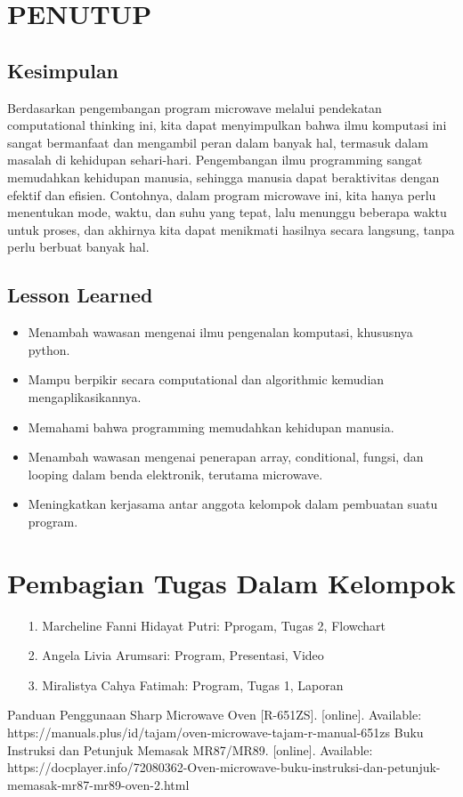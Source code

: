 \documentclass[conference]{IEEEtran}
\begin{document}
\clearpage
\section{PENUTUP}

\subsection{Kesimpulan}
Berdasarkan pengembangan program microwave melalui pendekatan computational thinking ini, kita dapat menyimpulkan bahwa ilmu komputasi ini sangat bermanfaat dan mengambil peran dalam banyak hal,
termasuk dalam masalah di kehidupan sehari-hari. Pengembangan ilmu programming sangat memudahkan kehidupan manusia, sehingga manusia dapat beraktivitas dengan efektif dan efisien.
Contohnya, dalam program microwave ini, kita hanya perlu menentukan mode, waktu, dan suhu yang tepat, lalu menunggu beberapa waktu untuk proses, dan akhirnya kita dapat menikmati hasilnya secara langsung,
tanpa perlu berbuat banyak hal.

\subsection{Lesson Learned}
\begin{itemize}
    \item Menambah wawasan mengenai ilmu pengenalan komputasi, khususnya python.
    \item Mampu berpikir secara computational dan algorithmic kemudian mengaplikasikannya.
    \item Memahami bahwa programming memudahkan kehidupan manusia.
    \item Menambah wawasan mengenai penerapan array, conditional, fungsi, dan looping dalam benda elektronik, terutama microwave.
    \item Meningkatkan kerjasama antar anggota kelompok dalam pembuatan suatu program.
\end{itemize}

\section{Pembagian Tugas Dalam Kelompok}

\begin{enumerate}
\item[1.] Marcheline Fanni Hidayat Putri: Pprogam, Tugas 2, Flowchart
\item[2.] Angela Livia Arumsari: Program, Presentasi, Video
\item[3.] Miralistya Cahya Fatimah: Program, Tugas 1, Laporan
\end{enumerate}

\begin{thebibliography}{00}
 Panduan Penggunaan Sharp Microwave Oven [R-651ZS]. [online]. Available: https://manuals.plus/id/tajam/oven-microwave-tajam-r-manual-651zs
 Buku Instruksi dan Petunjuk Memasak MR87/MR89. [online]. Available: https://docplayer.info/72080362-Oven-microwave-buku-instruksi-dan-petunjuk-memasak-mr87-mr89-oven-2.html
\end{thebibliography}
\vspace{12pt}
\end{document}
